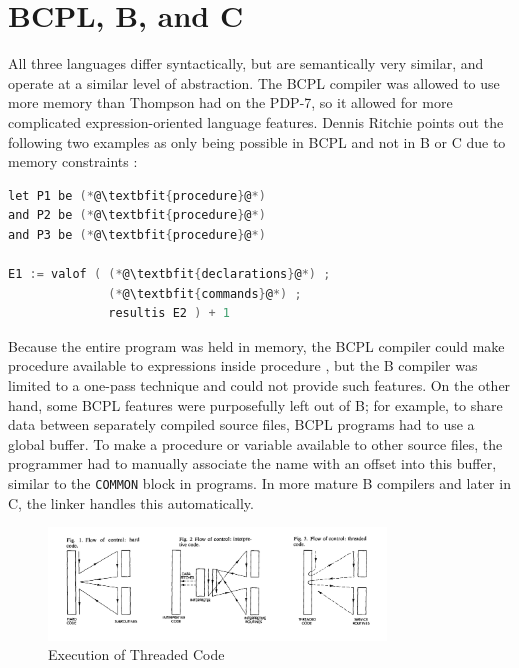 \section{BCPL, B, and C}

All three languages differ syntactically, but are semantically very similar,
and operate at a similar level of abstraction.
The BCPL compiler was allowed to use more memory than Thompson had on the PDP-7,
so it allowed for more complicated expression-oriented language features.
Dennis Ritchie points out the following two examples as only being possible
in BCPL and not in B or C due to memory constraints
\cite{development_of_c_language_ritchie_1996}:

\begin{lstlisting}[language=c,frame=single]
let P1 be (*@\textbfit{procedure}@*)
and P2 be (*@\textbfit{procedure}@*)
and P3 be (*@\textbfit{procedure}@*)

E1 := valof ( (*@\textbfit{declarations}@*) ;
              (*@\textbfit{commands}@*) ;
              resultis E2 ) + 1
\end{lstlisting}

Because the entire program was held in memory, the BCPL compiler could make
procedure  available to expressions inside procedure ,
but the B compiler was limited to a one-pass technique and could not provide such features.
On the other hand, some BCPL features were purposefully left out of B; for example,
to share data between separately compiled source files, BCPL programs had to use
a global buffer. To make a procedure or variable available to other source files,
the programmer had to manually associate the name with an offset into this buffer,
similar to the \texttt{COMMON} block in \ftn{} programs.
In more mature B compilers and later in C, the linker handles this automatically.

\begin{figure}[h]
    \centering
    \includegraphics[width=0.8\textwidth]{resource/software/unix/bell-threaded-code-figures.png}
    \caption{Execution of Threaded Code\cite{bell_threaded_code_1973}}
    \label{fig:bell-threaded-code}
\end{figure}

